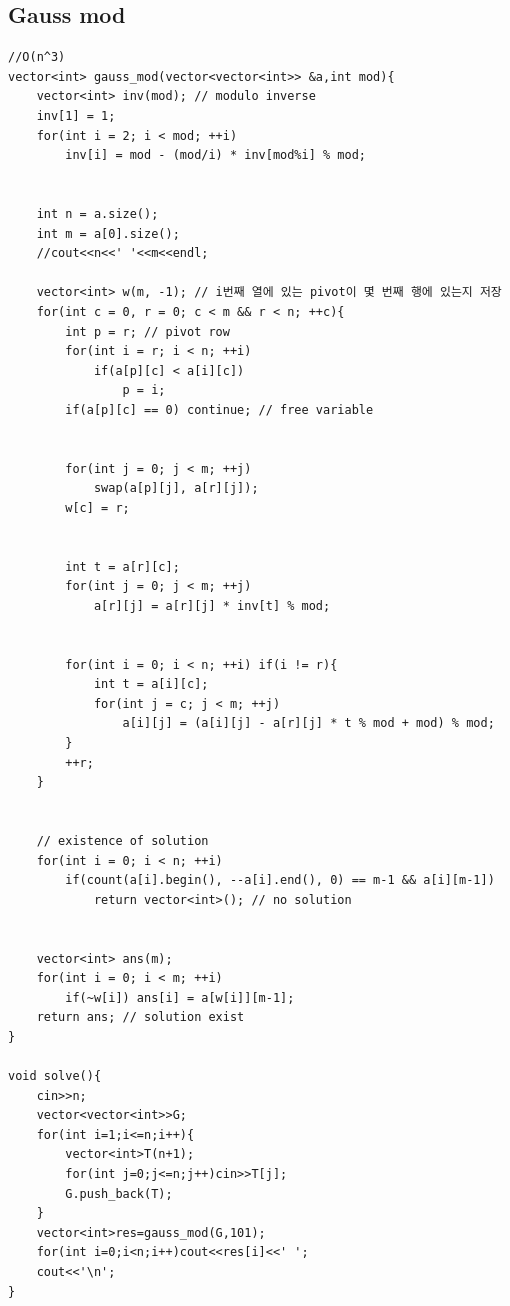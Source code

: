 \documentclass[landscape, 8pt, a4paper, oneside, twocolumn]{extarticle}
\begin{document}
\subsection{Gauss mod}
\begin{verbatim}
//O(n^3)
vector<int> gauss_mod(vector<vector<int>> &a,int mod){
    vector<int> inv(mod); // modulo inverse
    inv[1] = 1;
    for(int i = 2; i < mod; ++i)
        inv[i] = mod - (mod/i) * inv[mod%i] % mod;


    int n = a.size();
    int m = a[0].size();
	//cout<<n<<' '<<m<<endl;

    vector<int> w(m, -1); // i번째 열에 있는 pivot이 몇 번째 행에 있는지 저장
    for(int c = 0, r = 0; c < m && r < n; ++c){
        int p = r; // pivot row
        for(int i = r; i < n; ++i)
            if(a[p][c] < a[i][c])
                p = i;
        if(a[p][c] == 0) continue; // free variable


        for(int j = 0; j < m; ++j)
            swap(a[p][j], a[r][j]);
        w[c] = r;


        int t = a[r][c];
        for(int j = 0; j < m; ++j)
            a[r][j] = a[r][j] * inv[t] % mod;


        for(int i = 0; i < n; ++i) if(i != r){
            int t = a[i][c];
            for(int j = c; j < m; ++j)
                a[i][j] = (a[i][j] - a[r][j] * t % mod + mod) % mod;
        }
        ++r;
    }


    // existence of solution
    for(int i = 0; i < n; ++i)
        if(count(a[i].begin(), --a[i].end(), 0) == m-1 && a[i][m-1])
            return vector<int>(); // no solution


    vector<int> ans(m);
    for(int i = 0; i < m; ++i)
        if(~w[i]) ans[i] = a[w[i]][m-1];
    return ans; // solution exist
}

void solve(){
	cin>>n;
	vector<vector<int>>G;
	for(int i=1;i<=n;i++){
		vector<int>T(n+1);
		for(int j=0;j<=n;j++)cin>>T[j];
		G.push_back(T);
	}
	vector<int>res=gauss_mod(G,101);
	for(int i=0;i<n;i++)cout<<res[i]<<' ';
	cout<<'\n';
}
\end{verbatim}
\end{document}
